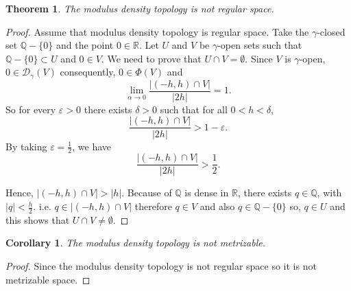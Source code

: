\documentclass{amsart}
\newtheorem{theorem}{Theorem}
\theoremstyle{plain}
\newtheorem{corollary}{Corollary}
\numberwithin{equation}{section}
\begin{document}
\begin{theorem}
    The modulus density topology is not regular space.
\end{theorem}
\begin{proof}
Assume that modulus density topology is regular space. Take the $\gamma$-closed set $\mathbb{Q}-\{0\}$ and the point $0\in \mathbb{R}$. Let $U$ and $V$ be $\gamma$-open sets such that $\mathbb{Q}-\{0\}\subset U$ and $0 \in V$. We need to prove that $U\cap V=\emptyset$. Since $V$ is $\gamma$-open, $0\in \mathcal{D}_\gamma (V)$ consequently, $0\in \Phi(V)$ and $$\lim_{\alpha \to 0} \frac{|(-h,h)\cap V|}{|2h|}=1.$$ So for every $\varepsilon>0 $ there exists $\delta >0$ such that for all $0<h<\delta$, $$\frac{|(-h,h)\cap V|}{|2h|}>1-\varepsilon.$$ By taking $\varepsilon= \frac{1}{2}$, we have $$\frac{|(-h,h)\cap V|}{|2h|}>\frac{1}{2}.$$ 

Hence, $|(-h,h)\cap V| >|h|.$ Because of $\mathbb{Q}$ is dense in $\mathbb{R}$, there exists $q\in \mathbb{Q}$, with $|q|< \frac{h}{2}$. i.e. $q\in |(-h,h)\cap V|$ therefore $q\in V$ and also $q\in \mathbb{Q}-\{0\}$ so, $q\in U$ and this shows that $U \cap V\neq \emptyset.$
\end{proof}
\begin{corollary}
    The modulus density topology is not metrizable.
\end{corollary}
\begin{proof}
    Since the modulus density topology is not regular space so it is not metrizable space.
\end{proof}
\end{document}
